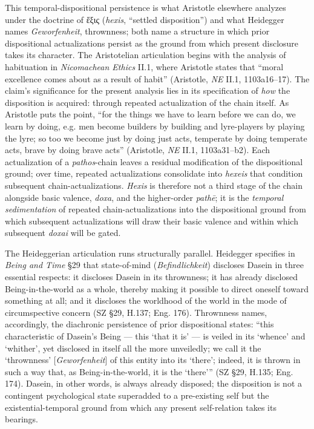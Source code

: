 This temporal-dispositional persistence is what Aristotle elsewhere analyzes under the doctrine of ἕξις (\textit{hexis}, ``settled disposition'') and what Heidegger names \textit{Geworfenheit}, thrownness; both name a structure in which prior dispositional actualizations persist as the ground from which present disclosure takes its character. The Aristotelian articulation begins with the analysis of habituation in \textit{Nicomachean Ethics} II.1, where Aristotle states that ``moral excellence comes about as a result of habit'' (Aristotle, \textit{NE} II.1, 1103a16--17). The claim's significance for the present analysis lies in its specification of \textit{how} the disposition is acquired: through repeated actualization of the chain itself. As Aristotle puts the point, ``for the things we have to learn before we can do, we learn by doing, e.g. men become builders by building and lyre-players by playing the lyre; so too we become just by doing just acts, temperate by doing temperate acts, brave by doing brave acts'' (Aristotle, \textit{NE} II.1, 1103a31--b2). Each actualization of a \textit{pathos}-chain leaves a residual modification of the dispositional ground; over time, repeated actualizations consolidate into \textit{hexeis} that condition subsequent chain-actualizations. \textit{Hexis} is therefore not a third stage of the chain alongside basic valence, \textit{doxa}, and the higher-order \textit{path\=e}; it is the \textit{temporal sedimentation} of repeated chain-actualizations into the dispositional ground from which subsequent actualizations will draw their basic valence and within which subsequent \textit{doxai} will be gated.

The Heideggerian articulation runs structurally parallel. Heidegger specifies in \textit{Being and Time} \S29 that state-of-mind (\textit{Befindlichkeit}) discloses Dasein in three essential respects: it discloses Dasein in its thrownness; it has already disclosed Being-in-the-world as a whole, thereby making it possible to direct oneself toward something at all; and it discloses the worldhood of the world in the mode of circumspective concern (SZ \S29, H.137; Eng. 176). Thrownness names, accordingly, the diachronic persistence of prior dispositional states: ``this characteristic of Dasein's Being --- this `that it is' --- is veiled in its `whence' and `whither', yet disclosed in itself all the more unveiledly; we call it the `thrownness' [\textit{Geworfenheit}] of this entity into its `there'; indeed, it is thrown in such a way that, as Being-in-the-world, it is the `there''' (SZ \S29, H.135; Eng. 174). Dasein, in other words, is always already disposed; the disposition is not a contingent psychological state superadded to a pre-existing self but the existential-temporal ground from which any present self-relation takes its bearings.

